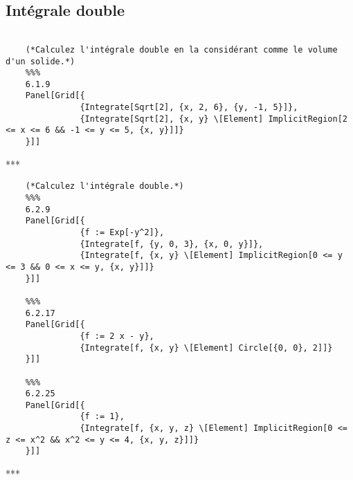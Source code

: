 	\subsection{Intégrale double}
	\begin{verbatim}
	
	(*Calculez l'intégrale double en la considérant comme le volume d'un solide.*)
	%%%
	6.1.9
	Panel[Grid[{
	           {Integrate[Sqrt[2], {x, 2, 6}, {y, -1, 5}]},
	           {Integrate[Sqrt[2], {x, y} \[Element] ImplicitRegion[2 <= x <= 6 && -1 <= y <= 5, {x, y}]]}
	}]]
	\end{verbatim}
	\begin{center}***\end{center}
	\begin{verbatim}
	(*Calculez l'intégrale double.*)
	%%%
	6.2.9
	Panel[Grid[{
	           {f := Exp[-y^2]},
	           {Integrate[f, {y, 0, 3}, {x, 0, y}]},
	           {Integrate[f, {x, y} \[Element] ImplicitRegion[0 <= y <= 3 && 0 <= x <= y, {x, y}]]}
	}]]

	%%%
	6.2.17
	Panel[Grid[{
	           {f := 2 x - y},
	           {Integrate[f, {x, y} \[Element] Circle[{0, 0}, 2]]}
	}]]
	
	%%%
	6.2.25
	Panel[Grid[{
	           {f := 1},
	           {Integrate[f, {x, y, z} \[Element] ImplicitRegion[0 <= z <= x^2 && x^2 <= y <= 4, {x, y, z}]]}
	}]]
	\end{verbatim}
	\begin{center}***\end{center}
